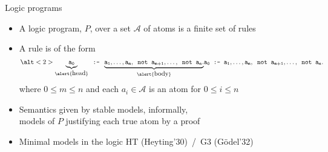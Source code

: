 \begin{frame}{Logic programs}
  \label{eqn:rule}
  \begin{itemize}
  \item <1->
    A \alert{logic program}, $P$, over a set $\mathcal{A}$ of atoms is a finite \alert{set} of rules
    \medskip
  \item <1->
    A \alert{rule} is of the form
    \[
      \alt<2>{\underbrace{\tt a_0}_{\alert{\text{\normalsize head}}} \texttt{ :- } \underbrace{\tt a_1,\dots,a_m,\texttt{ not }{a_{m+1}},\dots,\texttt{ not }{a_n}.}_{\alert{\text{\normalsize body}}}}
             {\tt            a_0                               \texttt{ :- }                  a_1,\dots,a_m,\texttt{ not }{a_{m+1}},\dots,\texttt{ not }{a_n}.}
    \]
    where $0\leq m\leq n$ and each $a_i\in{\mathcal{A}}$ is an \alert{atom} for $0\leq i\leq n$
    \bigskip
  \item <only@4->
    Semantics given by \alert{stable models}, informally,\\
    models of $P$ justifying each true atom by a proof
    \smallskip
  \item <only@5-> []
    Minimal models in the logic HT (Heyting'30)~/~G3 (G\"odel'32)
  \end{itemize}
\end{frame}
%

